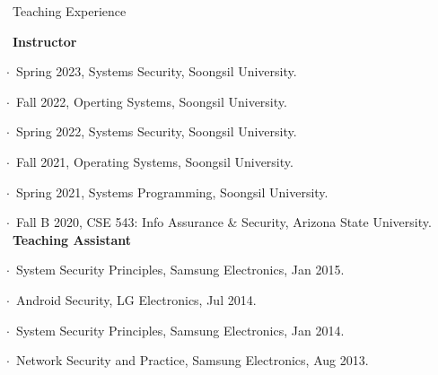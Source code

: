 \documentclass{resume} %
\begin{document}
\begin{rSection}{\faGenderless~Teaching Experience}

    \textbullet~{\bf Instructor} \\
        \strut\hspace{1cm}$\cdot$~Spring 2023, Systems Security, Soongsil University.\\
        \strut\hspace{1cm}$\cdot$~Fall 2022, Operting Systems, Soongsil University.\\
        \strut\hspace{1cm}$\cdot$~Spring 2022, Systems Security, Soongsil University.\\
        \strut\hspace{1cm}$\cdot$~Fall 2021, Operating Systems, Soongsil University.\\
        \strut\hspace{1cm}$\cdot$~Spring 2021, Systems Programming, Soongsil University.\\
        \strut\hspace{1cm}$\cdot$~Fall B 2020, CSE 543: Info Assurance \& Security, Arizona State University.\\

	\textbullet~{\bf Teaching Assistant} \\
		\strut\hspace{1cm}$\cdot$~System Security Principles, Samsung Electronics, Jan 2015.\\
		\strut\hspace{1cm}$\cdot$~Android Security, LG Electronics, Jul 2014.\\
		\strut\hspace{1cm}$\cdot$~System Security Principles, Samsung Electronics, Jan 2014.\\
		\strut\hspace{1cm}$\cdot$~Network Security and Practice, Samsung Electronics, Aug 2013.

	\vspace{3mm}
\end{rSection}	

%
\end{document}
